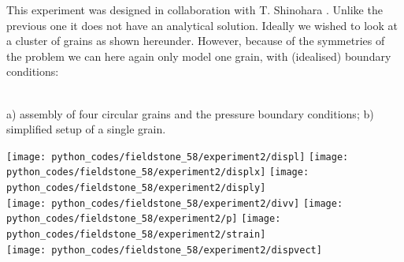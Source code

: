 This experiment was designed in collaboration with T. Shinohara . 
Unlike the previous one it does not have an analytical solution. Ideally we wished to look at a 
cluster of grains as shown hereunder. However, because of the symmetries of the problem we can 
here again only model one grain, with (idealised) boundary conditions:
 
\begin{center}
\\
{\captionfont a) assembly of four circular grains and the pressure boundary conditions; 
b) simplified setup of a single grain.}
\end{center}

\begin{center}
\texttt{[image: python\_codes/fieldstone\_58/experiment2/displ]}
\texttt{[image: python\_codes/fieldstone\_58/experiment2/displx]}
\texttt{[image: python\_codes/fieldstone\_58/experiment2/disply]}\\
\texttt{[image: python\_codes/fieldstone\_58/experiment2/divv]}
\texttt{[image: python\_codes/fieldstone\_58/experiment2/p]}
\texttt{[image: python\_codes/fieldstone\_58/experiment2/strain]}\\
\texttt{[image: python\_codes/fieldstone\_58/experiment2/dispvect]}
\end{center}



